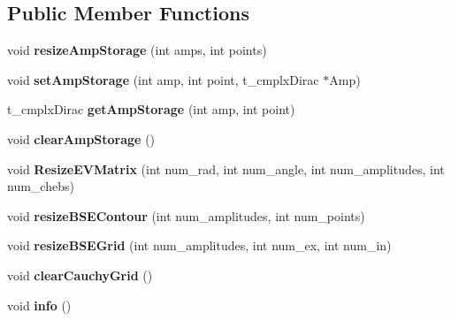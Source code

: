 \subsection*{Public Member Functions}
\begin{DoxyCompactItemize}
\item 
\hypertarget{class_c___dedic_mem___b_s_e_ad6928f35d1bb6dc0a9e7896cb435de77}{void {\bfseries resize\-Amp\-Storage} (int amps, int points)}\label{class_c___dedic_mem___b_s_e_ad6928f35d1bb6dc0a9e7896cb435de77}

\item 
\hypertarget{class_c___dedic_mem___b_s_e_ae0fc9faee6bf0212366e272929d05299}{void {\bfseries set\-Amp\-Storage} (int amp, int point, t\-\_\-cmplx\-Dirac $\ast$Amp)}\label{class_c___dedic_mem___b_s_e_ae0fc9faee6bf0212366e272929d05299}

\item 
\hypertarget{class_c___dedic_mem___b_s_e_a1e45518a37fafeb43d866fdf8b60dbd6}{t\-\_\-cmplx\-Dirac {\bfseries get\-Amp\-Storage} (int amp, int point)}\label{class_c___dedic_mem___b_s_e_a1e45518a37fafeb43d866fdf8b60dbd6}

\item 
\hypertarget{class_c___dedic_mem___b_s_e_a832e259d5897e9b274d529979d92d08f}{void {\bfseries clear\-Amp\-Storage} ()}\label{class_c___dedic_mem___b_s_e_a832e259d5897e9b274d529979d92d08f}

\item 
\hypertarget{class_c___dedic_mem___b_s_e_a4e6c97cc94e185ccb93b4b83a6caa986}{void {\bfseries Resize\-E\-V\-Matrix} (int num\-\_\-rad, int num\-\_\-angle, int num\-\_\-amplitudes, int num\-\_\-chebs)}\label{class_c___dedic_mem___b_s_e_a4e6c97cc94e185ccb93b4b83a6caa986}

\item 
\hypertarget{class_c___dedic_mem___b_s_e_a77dd95cd06387357599deb84c8a1b5f3}{void {\bfseries resize\-B\-S\-E\-Contour} (int num\-\_\-amplitudes, int num\-\_\-points)}\label{class_c___dedic_mem___b_s_e_a77dd95cd06387357599deb84c8a1b5f3}

\item 
\hypertarget{class_c___dedic_mem___b_s_e_a1acb22de1a69296a075dc76a066c1cff}{void {\bfseries resize\-B\-S\-E\-Grid} (int num\-\_\-amplitudes, int num\-\_\-ex, int num\-\_\-in)}\label{class_c___dedic_mem___b_s_e_a1acb22de1a69296a075dc76a066c1cff}

\item 
\hypertarget{class_c___dedic_mem___b_s_e_a8eb9828cf1137c08d65e9c531f57dd87}{void {\bfseries clear\-Cauchy\-Grid} ()}\label{class_c___dedic_mem___b_s_e_a8eb9828cf1137c08d65e9c531f57dd87}

\item 
\hypertarget{class_c___dedic_mem___b_s_e_a7db75e75c587b9a25e937bb77ee399d7}{void {\bfseries info} ()}\label{class_c___dedic_mem___b_s_e_a7db75e75c587b9a25e937bb77ee399d7}

\end{DoxyCompactItemize}
